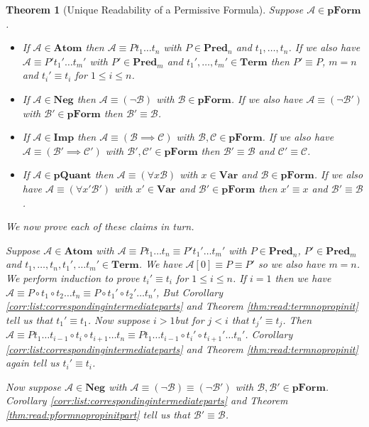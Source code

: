 \documentclass[12pt]{article}
\theoremstyle{break}
\theoremstyle{break}
\newtheorem{theorem}{Theorem}[section]
\theoremstyle{break}
\theoremstyle{break}
\theoremstyle{break}
\newtheorem{informal definition}[definition]{Informal Definition}
\newcommand{\mc}[1]{\mathcal{#1}}
\begin{document}
\begin{theorem}[Unique Readability of a Permissive Formula]
Suppose $\mc{A}\in\textbf{pForm}$.
\begin{itemize}
\item{If $\mc{A}\in\textbf{Atom}$ then $\mc{A}\equiv Pt_1\ldots t_n$ with $P\in\textbf{Pred}_n$ and $t_1,\ldots, t_n$. If we also have $\mc{A}\equiv P' t_1'\ldots t_m'$ with $P'\in\textbf{Pred}_m$ and $t_1',\ldots,t_m'\in\textbf{Term}$ then $P' \equiv P$, $m=n$ and $t_i'\equiv t_i$ for $1\le i \le n$.}
\item{If $\mc{A}\in\textbf{Neg}$ then $\mc{A}\equiv (\lnot \mc{B})$ with $\mc{B}\in\textbf{pForm}$. If we also have $\mc{A}\equiv (\lnot \mc{B}')$ with $\mc{B}'\in\textbf{pForm}$ then $\mc{B}'\equiv \mc{B}$.}
\item{If $\mc{A}\in\textbf{Imp}$ then $\mc{A}\equiv (\mc{B}\implies \mc{C})$ with $\mc{B},\mc{C}\in\textbf{pForm}$. If we also have $\mc{A}\equiv (\mc{B}'\implies \mc{C}')$ with $\mc{B}', \mc{C}'\in\textbf{pForm}$ then $\mc{B}'\equiv \mc{B}$ and $\mc{C}'\equiv \mc{C}$.}
\item{If $\mc{A}\in\textbf{pQuant}$ then $\mc{A}\equiv (\forall x \mc{B})$ with $x\in\textbf{Var}$ and $\mc{B}\in\textbf{pForm}$. If we also have $\mc{A}\equiv (\forall x' \mc{B}')$ with $x'\in\textbf{Var}$ and $\mc{B}'\in\textbf{pForm}$ then $x'\equiv x$ and $\mc{B}'\equiv \mc{B}$.}
\end{itemize}
We now prove each of these claims in turn.

Suppose $\mc{A}\in\textbf{Atom}$ with $\mc{A}\equiv Pt_1\ldots t_n\equiv P't_1'\ldots t_m'$ with $P\in\textbf{Pred}_n$, $P'\in\textbf{Pred}_m$ and $t_1,\ldots,t_n,t_1',\ldots t_m'\in\textbf{Term}$.
We have $\mc{A}[0]\equiv P\equiv P'$ so we also have $m=n$.
We perform induction to prove $t_i'\equiv t_i$ for $1\le i \le n$.
If $i=1$ then we have $\mc{A}\equiv P\circ t_1 \circ t_2\ldots t_n \equiv P\circ t_1' \circ t_2'\ldots t_n'$, But Corollary \ref{corr:list:correspondingintermediateparts} and Theorem \ref{thm:read:termnopropinit} tell us that $t_1'\equiv t_1$.
Now suppose $i > 1$but for $j<i$ that $t_j'\equiv t_j$.
Then $\mc{A}\equiv Pt_1\ldots t_{i-1} \circ t_i \circ t_{i+1} \ldots t_n \equiv Pt_1\ldots t_{i-1}\circ t_i' \circ t_{i+1}' \ldots t_n'$.
Corollary \ref{corr:list:correspondingintermediateparts} and Theorem \ref{thm:read:termnopropinit} again tell us $t_i'\equiv t_i$.

Now suppose $\mc{A}\in \textbf{Neg}$ with $\mc{A}\equiv (\lnot \mc{B}) \equiv (\lnot \mc{B}')$ with $\mc{B}, \mc{B}'\in\textbf{pForm}$.
Corollary \ref{corr:list:correspondingintermediateparts} and Theorem \ref{thm:read:pformnopropinitpart} tell us that $\mc{B}'\equiv \mc{B}$.


\end{theorem}
\end{document}

